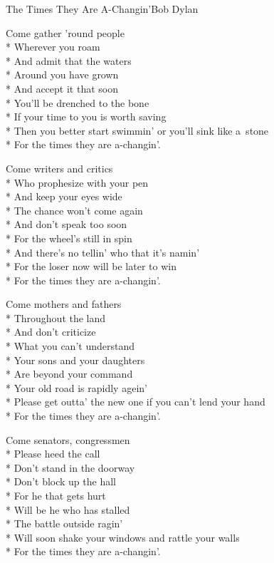 \documentclass[10.5pt]{book}
\begin{document}
\begin{poem}{The Times They Are A-Changin'}{Bob Dylan}

\settowidth{\versewidth}{Please get outta' the new one if you can’t lend your hand}

Come gather 'round people\\*
Wherever you roam\\*
And admit that the waters\\*
Around you have grown\\*
And accept it that soon\\*
You’ll be drenched to the bone\\*
If your time to you is worth saving\\*
Then you better start swimmin' or you’ll sink like a~stone\\*
For the times they are a-changin'.

Come writers and critics\\*
Who prophesize with your pen\\*
And keep your eyes wide\\*
The chance won’t come again\\*
And don’t speak too soon\\*
For the wheel’s still in spin\\*
And there’s no tellin' who that it’s namin'\\*
For the loser now will be later to win\\*
For the times they are a-changin'.

\vfill\eject

Come mothers and fathers\\*
Throughout the land\\*
And don’t criticize\\*
What you can’t understand\\*
Your sons and your daughters\\*
Are beyond your command\\*
Your old road is rapidly agein'\\*
Please get outta' the new one if you can’t lend your hand\\*
For the times they are a-changin'.

Come senators, congressmen\\*
Please heed the call\\*
Don’t stand in the doorway\\*
Don’t block up the hall\\*
For he that gets hurt\\*
Will be he who has stalled\\*
The battle outside ragin'\\*
Will soon shake your windows and rattle your walls\\*
For the times they are a-changin'.


\end{poem}
\end{document}
